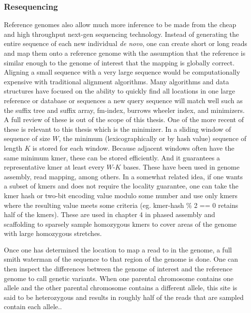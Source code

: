\subsubsection{Resequencing}

\par{
Reference genomes also allow much more inference to be made from the cheap and high throughput next-gen sequencing technology. Instead of generating the entire sequence of each new individual \textit{de novo}, one can create short or long reads and map them onto a reference genome with the assumption that the reference is similar enough to the genome of interest that the mapping is globally correct. Aligning a small sequence with a very large sequence would be computationally expensive with traditional alignment algorithms\cite{smithwaterman}\cite{needlemanwunsch}. Many algorithms and data structures have focused on the ability to quickly find all locations in one large reference or database or sequences a new query sequence will match well such as the suffix tree and suffix array, fm-index, burrows wheeler index, and minimizers. A full review of these is out of the scope of this thesis\cite{suffixarray}\cite{suffixtree}\cite{fmindex}\cite{fmindex2}\cite{bwa}\cite{blat}. One of the more recent of these is relevant to this thesis which is the minimizer. In a sliding window of sequence of size $W$, the minimum (lexicographically or by hash value) sequence of length $K$ is stored for each window\cite{minimizers}. Because adjacent windows often have the same minimum kmer, these can be stored efficiently. And it guarantees a representative kmer at least every $W$-$K$ bases. These have been used in genome assembly, read mapping, among others\cite{LSH}\cite{minimap2}\cite{mashmap}. In a somewhat related idea, if one wants a subset of kmers and does not require the locality guarantee, one can take the kmer hash or two-bit encoding value modulo some number and use only kmers where the resulting value meets some criteria (eg. kmer-hash \% 2 == 0 retains half of the kmers)\cite{modimizer}. These are used in chapter 4 in phased assembly and scaffolding to sparsely sample homozygous kmers to cover areas of the genome with large homozygous stretches. 
} \\

\par{
Once one has determined the location to map a read to in the genome, a full smith waterman of the sequence to that region of the genome is done\cite{smithwaterman}. One can then inspect the differences between the genome of interest and the reference genome to call genetic variants. When one parental chromosome contains one allele and the other parental chromosome contains a different allele, this site is said to be heterozygous and results in roughly half of the reads that are sampled contain each allele.\cite{freebayes}\cite{gatk}.
}

